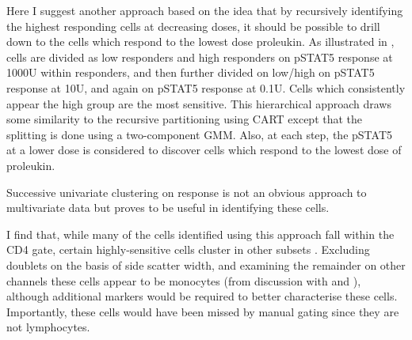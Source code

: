 Here I suggest another approach based on the idea that by recursively identifying the highest responding cells at decreasing doses, it should be
possible to drill down to the cells which respond to the lowest dose proleukin.
As illustrated in , cells are divided as low responders and high responders on pSTAT5 response at 1000U 
within responders, and then further divided on low/high on pSTAT5 response at 10U,
and again on pSTAT5 response at 0.1U.
Cells which consistently appear the high group are the most sensitive.
This hierarchical approach draws some similarity to the recursive partitioning using \gls{CART} except that the splitting is done using a two-component \gls{GMM}.
Also, at each step, the pSTAT5 at a lower dose is considered to discover cells which respond to the lowest dose of proleukin.

Successive univariate clustering on response is not an obvious approach to multivariate data but proves to be useful in identifying these cells.

I find that, while many of the cells identified using this approach fall within the CD4 gate,
certain highly-sensitive cells cluster in other subsets .
Excluding doublets on the basis of side scatter width,
and examining the remainder on other channels these cells appear to be monocytes (from discussion with  and ),
although additional markers would be required to better characterise these cells.
Importantly, these cells would have been missed by manual gating since they are not lymphocytes.



